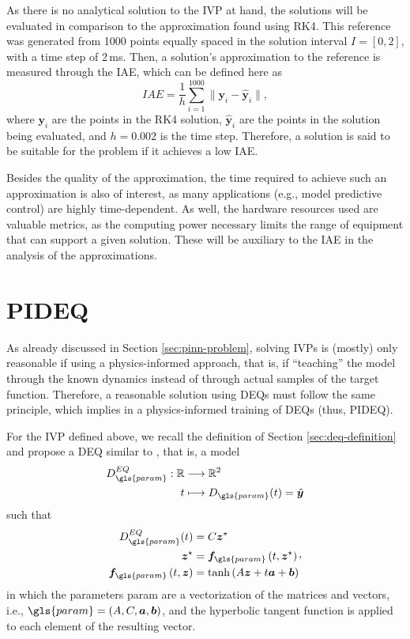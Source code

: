 As there is no analytical solution to the \gls{IVP} at hand, the solutions will be evaluated in comparison to the approximation found using \gls{RK4}.
This reference was generated from 1000 points equally spaced in the solution interval $I=[0,2]$, with a time step of 2\,ms\footnotemark.
Then, a solution's approximation to the reference is measured through the \gls{IAE}, which can be defined here as \[
    IAE = \frac{1}{h}\sum_{i=1}^{1000} \|\bm{y}_i - \hat{\bm{y}}_i\|
,\] where $\bm{y}_i$ are the points in the \gls{RK4} solution,  $\hat{\bm{y}}_i$ are the points in the solution being evaluated, and $h=0.002$ is the time step.
Therefore, a solution is said to be suitable for the problem if it achieves a low \gls{IAE}.

Besides the quality of the approximation, the time required to achieve such an approximation is also of interest, as many applications (e.g., model predictive control) are highly time-dependent.
As well, the hardware resources used are valuable metrics, as the computing power necessary limits the range of equipment that can support a given solution.
These will be auxiliary to the \gls{IAE} in the analysis of the approximations.

\section{PIDEQ}\label{sec:pideq}

As already discussed in Section \ref{sec:pinn-problem}, solving \gls{IVP}s is (mostly) only reasonable if using a physics-informed approach, that is, if ``teaching'' the model through the known dynamics instead of through actual samples of the target function.
Therefore, a reasonable solution using \gls{DEQ}s must follow the same principle, which implies in a physics-informed training of \gls{DEQ}s (thus, \gls{PIDEQ}).

For the \gls{IVP} defined above, we recall the definition of Section \ref{sec:deq-definition} and propose a \gls{DEQ} similar to \textcite{Ghaoui2019}, that is, a model
\begin{align*}
    D_{\gls{param}}^{EQ}: \R &\longrightarrow \R^2 \\
    t &\longmapsto D_{\gls{param}}(t) = \hat{\bm{y}}
\end{align*}
such that
\begin{equation}
\begin{split}
    D^{EQ}_{\gls{param}}(t) &= C\bm{z}^{\star} \\
    \bm{z}^{\star} &= \bm{f}_{\gls{param}}\left( t,\bm{z}^{\star} \right) \\
    \bm{f}_{\gls{param}}\left( t,\bm{z} \right) &= \tanh \left( A\bm{z} + t\bm{a} + \bm{b} \right)
\end{split}
,\end{equation}
in which the parameters \gls{param} are a vectorization of the matrices and vectors, i.e., $\gls{param} = \left( A,C,\bm{a},\bm{b} \right)$, and the hyperbolic tangent function is applied to each element of the resulting vector.


